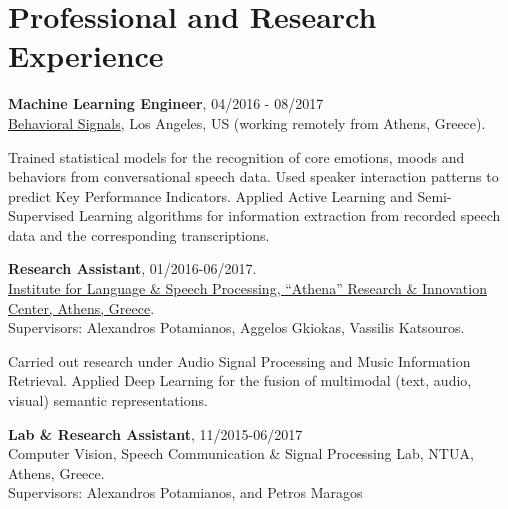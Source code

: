 \documentclass[letterpaper]{article}
\renewenvironment{itemize}{
  \begin{list}{}{
    \setlength{\leftmargin}{1.5em}
  }
}{
  \end{list}
}
\begin{document}
\section*{Professional and Research Experience}

\begin{itemize}

\item 
    \textbf{Machine Learning Engineer}, 04/2016 - 08/2017\\ 
    \href{https://behavioralsignals.com/}{Behavioral Signals}, Los Angeles, US (working remotely from Athens, Greece).
    \begin{itemize}
    \item Trained statistical models for the recognition of core emotions, moods and behaviors from conversational speech data. Used speaker interaction patterns to predict Key Performance Indicators. Applied Active Learning and Semi-Supervised Learning algorithms for information extraction from recorded speech data and the corresponding transcriptions.
    \end{itemize}


    
    

\item 
    \textbf{Research Assistant}, 01/2016-06/2017.\\
    \href{http://www.ilsp.gr/en}{Institute for Language \& Speech Processing, ``Athena'' Research \& Innovation Center, Athens, Greece}.\\
    Supervisors: Alexandros Potamianos, Aggelos Gkiokas, Vassilis Katsouros.


    \begin{itemize}
    \item 
        Carried out research under Audio Signal Processing and Music Information Retrieval. Applied Deep Learning for the fusion of multimodal (text, audio, visual) semantic representations. 
    \end{itemize}
\iffalse
\item 
    \textbf{Lab \& Research Assistant}, 11/2015-06/2017\\
    Computer Vision, Speech Communication \& Signal Processing Lab, NTUA, Athens, Greece.\\
    Supervisors: Alexandros Potamianos, and Petros Maragos


\end{itemize}
\end{document}
